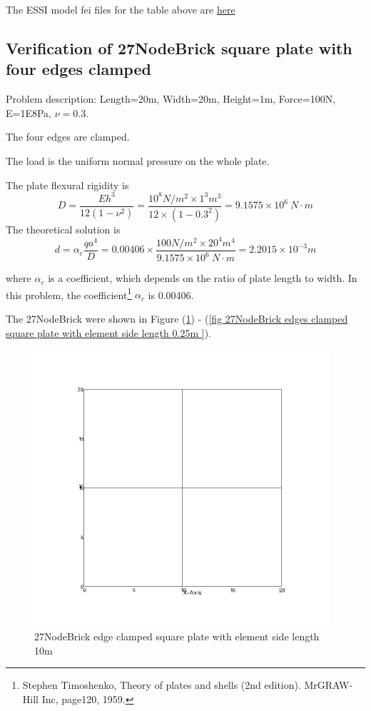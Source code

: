 \documentclass[fleqn,11pt,letter]{article}
\begin{document}
The ESSI model fei files for the table above are \href{https://github.com/yuan-energy/ESSI_Verification/blob/master/27NodeBrick/cantilever_stress/cantilever_stress.tar.gz?raw=true}{here}




\newpage
\subsection{Verification of 27NodeBrick square plate with four edges clamped}

Problem description: Length=20m, Width=20m, Height=1m, Force=100N, E=1E8Pa, $\nu=0.3$. 

The four edges are clamped. 

The load is the uniform normal pressure on the whole plate. 


The plate flexural rigidity is 
\begin{equation}
  D=\frac{Eh^3}{12(1-\nu^2)}=\frac{10^8 N/m^2 \times 1^3 m^3 }{12 \times (1-0.3^2) }= 9.1575 \times 10^6 \ N\cdot m
\end{equation}
The theoretical solution is 
\begin{equation}
  d=\alpha_c \frac{q a^4}{D}=0.00406\times \frac{100 N/m^2 \times 20^4 m^4}{9.1575 \times 10^6 \ N\cdot m}=2.2015\times 10^{-3} m
\end{equation}

where $\alpha_c$ is a coefficient, which depends on the ratio of plate length to width. In this problem, the coefficient\footnote{Stephen Timoshenko, Theory of plates and shells (2nd edition). MrGRAW-Hill Inc, page120, 1959.} $\alpha_c$ is 0.00406.

The 27NodeBrick were shown in Figure (\ref{fig 27NodeBrick edges clamped square plate with element side length 10m }) - (\ref{fig 27NodeBrick edges clamped square plate with element side length 0.25m }). 


\begin{figure}[H]
  \centering
  \includegraphics[width=11cm]{../Figure_files/27NodeBrick/square_plate1.png}
  \caption{27NodeBrick edge clamped square plate with element side length 10m }
  \label{fig 27NodeBrick edges clamped square plate with element side length 10m }
\end{figure}
\end{document}
